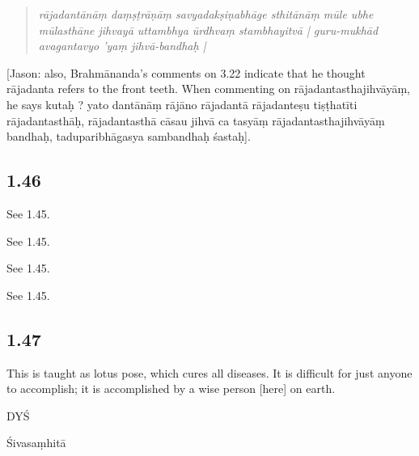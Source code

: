 \begin{ekdosis}
\begin{philcomm}[hp01_045]
\begin{quote}
\emph{rājadantānāṃ daṃṣṭrāṇāṃ savyadakṣiṇabhāge sthitānāṃ mūle ubhe mūlasthāne jihvayā uttambhya ūrdhvaṃ stambhayitvā | guru-mukhād avagantavyo 'yaṃ jihvā-bandhaḥ |}
\end{quote}

[Jason: also, Brahmānanda’s comments on 3.22 indicate that he thought rājadanta refers to the front teeth. When commenting on rājadantasthajihvāyāṃ, he says kutaḥ ? yato dantānāṃ rājāno rājadantā rājadanteṣu tiṣṭhatīti rājadantasthāḥ, rājadantasthā cāsau jihvā ca tasyāṃ rājadantasthajihvāyāṃ bandhaḥ, taduparibhāgasya sambandhaḥ śastaḥ].
\end{philcomm}

\subsection*{1.46}
\begin{translation}[hp01_046]
See 1.45.
\end{translation}

\begin{sources}[hp01_046]
See 1.45.
\end{sources}

\begin{testimonia}[hp01_046]
See 1.45.
\end{testimonia}

\begin{philcomm}[hp01_046]
See 1.45.
\end{philcomm}

\subsection*{1.47}
\begin{translation}[hp01_047]
This is taught as lotus pose, which cures all diseases. It is difficult for just anyone to accomplish; it is accomplished by a wise person [here] on earth.
\end{translation}

\begin{sources}[hp01_047]
DYŚ

\begin{versinnote}
\end{versinnote}

Śivasaṃhitā


\end{sources}
\end{ekdosis}
